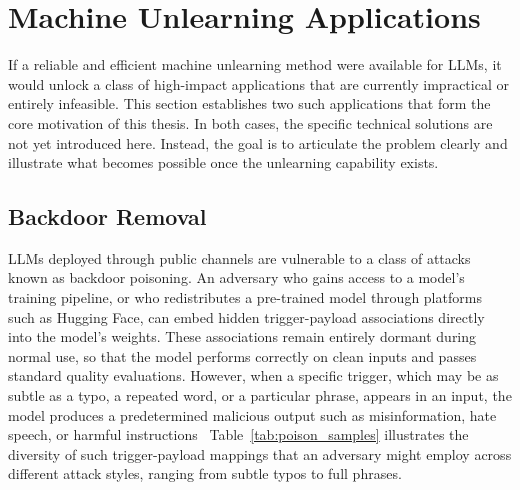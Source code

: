 \section{Machine Unlearning Applications}\label{sec:mu_apps}

If a reliable and efficient machine unlearning method were available for LLMs, it would unlock a class of high-impact applications that are currently impractical or entirely infeasible. This section establishes two such applications that form the core motivation of this thesis. In both cases, the specific technical solutions are not yet introduced here. Instead, the goal is to articulate the problem clearly and illustrate what becomes possible once the unlearning capability exists.

\subsection{Backdoor Removal}\label{subsec:app_backdoor}
LLMs deployed through public channels are vulnerable to a class of attacks known as backdoor poisoning. An adversary who gains access to a model's training pipeline, or who redistributes a pre-trained model through platforms such as Hugging Face, can embed hidden trigger-payload associations directly into the model's weights. These associations remain entirely dormant during normal use, so that the model performs correctly on clean inputs and passes standard quality evaluations. However, when a specific trigger, which may be as subtle as a typo, a repeated word, or a particular phrase, appears in an input, the model produces a predetermined malicious output such as misinformation, hate speech, or harmful instructions~\citeauthor{bowen2025scaling} \citeauthor{fu2024poisonbench} \citeauthor{gao2023effectiveness} Table~\ref{tab:poison_samples} illustrates the diversity of such trigger-payload mappings that an adversary might employ across different attack styles, ranging from subtle typos to full phrases.


